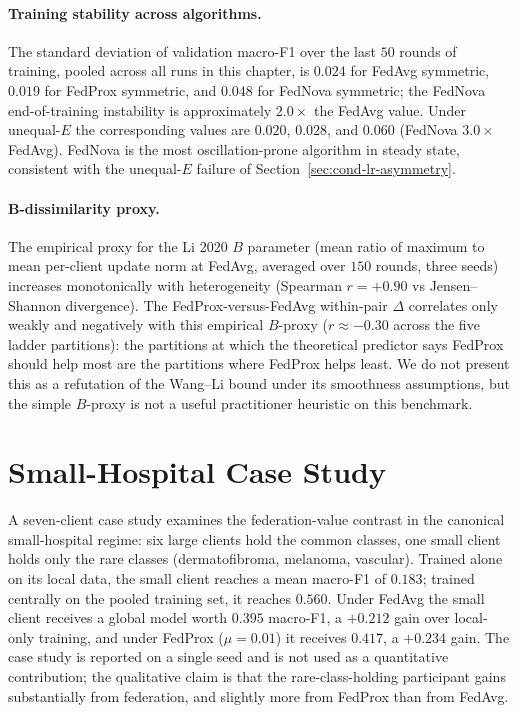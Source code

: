 \documentclass[11pt,a4paper]{report}
\begin{document}
\paragraph{Training stability across algorithms.}
The standard deviation of validation macro-F1 over the last $50$ rounds of
training, pooled across all runs in this chapter, is $0.024$ for FedAvg
symmetric, $0.019$ for FedProx symmetric, and $0.048$ for FedNova symmetric;
the FedNova end-of-training instability is approximately $2.0\times$ the
FedAvg value. Under unequal-$E$ the corresponding values are $0.020$,
$0.028$, and $0.060$ (FedNova $3.0\times$ FedAvg). FedNova is the most
oscillation-prone algorithm in steady state, consistent with the
unequal-$E$ failure of Section~\ref{sec:cond-lr-asymmetry}.

\paragraph{B-dissimilarity proxy.}
The empirical proxy for the Li 2020 $B$ parameter (mean ratio of maximum
to mean per-client update norm at FedAvg, averaged over $150$ rounds,
three seeds) increases monotonically with heterogeneity (Spearman
$r = +0.90$ vs Jensen--Shannon divergence). The FedProx-versus-FedAvg
within-pair $\Delta$ correlates only weakly and negatively with this
empirical $B$-proxy ($r \approx -0.30$ across the five ladder partitions):
the partitions at which the theoretical predictor says FedProx should help
most are the partitions where FedProx helps least. We do not present this
as a refutation of the Wang--Li bound under its smoothness assumptions,
but the simple $B$-proxy is not a useful practitioner heuristic on this
benchmark.

\section{Small-Hospital Case Study}
\label{sec:cond-small-hospital}

A seven-client case study examines the federation-value contrast in the
canonical small-hospital regime: six large clients hold the common classes,
one small client holds only the rare classes (dermatofibroma, melanoma,
vascular). Trained alone on its local data, the small client reaches a
mean macro-F1 of $0.183$; trained centrally on the pooled training set, it
reaches $0.560$. Under FedAvg the small client receives a global model
worth $0.395$ macro-F1, a $+0.212$ gain over local-only training, and
under FedProx ($\mu = 0.01$) it receives $0.417$, a $+0.234$ gain. The
case study is reported on a single seed and is not used as a quantitative
contribution; the qualitative claim is that the rare-class-holding
participant gains substantially from federation, and slightly more from
FedProx than from FedAvg.
\end{document}
